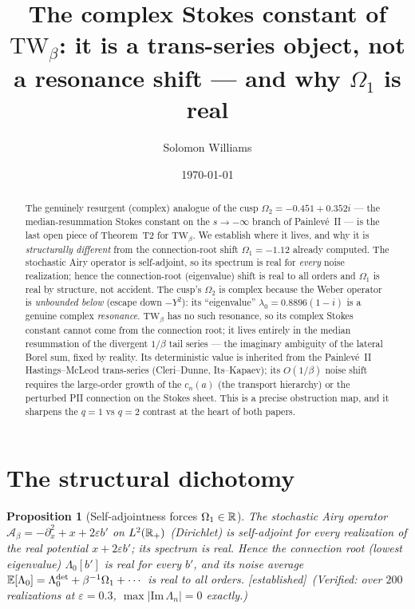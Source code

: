 \documentclass[11pt,reqno]{amsart}
\theoremstyle{plain}\newtheorem{proposition}{Proposition}\newtheorem{corollary}[proposition]{Corollary}
\theoremstyle{remark}\newtheorem{remark}[proposition]{Remark}
\newcommand{\eps}{\varepsilon}
\newcommand{\OK}{{\footnotesize\textsf{[established]}}}\newcommand{\cited}{{\footnotesize\textsf{[cited]}}}
\begin{document}
\title[The $s\to-\infty$ Stokes constant]{The complex Stokes constant of $\mathrm{TW}_\beta$: it is
a trans-series object, not a resonance shift --- and why $\Omega_1$ is real}
\author{Solomon Williams}\date{\today}
\begin{abstract}
The genuinely resurgent (complex) analogue of the cusp $\Omega_2=-0.451+0.352i$ --- the
median-resummation Stokes constant on the $s\to-\infty$ branch of Painlev\'e~II --- is the last
open piece of Theorem~T2 for $\mathrm{TW}_\beta$. We establish where it lives, and why it is
\emph{structurally different} from the connection-root shift $\Omega_1=-1.12$ already computed. The
stochastic Airy operator is self-adjoint, so its spectrum is real for \emph{every} noise
realization; hence the connection-root (eigenvalue) shift is real to all orders and $\Omega_1$ is
real by structure, not accident. The cusp's $\Omega_2$ is complex because the Weber operator is
\emph{unbounded below} (escape down $-Y^2$): its ``eigenvalue'' $\lambda_0=0.8896(1-i)$ is a
genuine complex \emph{resonance}. $\mathrm{TW}_\beta$ has no such resonance, so its complex Stokes
constant cannot come from the connection root; it lives entirely in the median resummation of the
divergent $1/\beta$ tail series --- the imaginary ambiguity of the lateral Borel sum, fixed by
reality. Its deterministic value is inherited from the Painlev\'e~II Hastings--McLeod trans-series
(Cleri--Dunne, Its--Kapaev); its $O(1/\beta)$ noise shift requires the large-order growth of the
$c_n(a)$ (the transport hierarchy) or the perturbed PII connection on the Stokes sheet. This is a
precise obstruction map, and it sharpens the $q{=}1$ vs $q{=}2$ contrast at the heart of both papers.
\end{abstract}
\maketitle

\section{The structural dichotomy}

\begin{proposition}[Self-adjointness forces $\Omega_1\in\mathbb{R}$]\label{prop:sa}
The stochastic Airy operator $\mathcal A_\beta=-\partial_x^2+x+2\eps b'$ on $L^2(\mathbb{R}_+)$ (Dirichlet)
is self-adjoint for every realization of the real potential $x+2\eps b'$; its spectrum is real.
Hence the connection root (lowest eigenvalue) $\Lambda_0[b']$ is real for every $b'$, and its
noise average $\mathbb{E}[\Lambda_0]=\Lambda_0^{\det}+\beta^{-1}\Omega_1+\cdots$ is real to all orders.
\OK\ \emph{(Verified: over $200$ realizations at $\eps=0.3$, $\max|\mathrm{Im}\,\Lambda_n|=0$
exactly.)}
\end{proposition}
\end{document}
